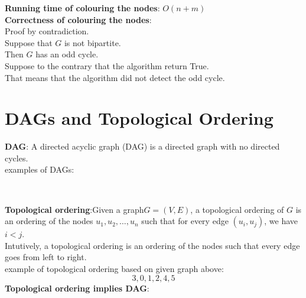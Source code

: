 \documentclass[onecolumn]{report}
\begin{document}
\noindent
\textbf{Running time of colouring the nodes}: $O(n+m)$\\
\textbf{Correctness of colouring the nodes}:\\
Proof by contradiction.\\
Suppose that $G$ is not bipartite.\\
Then $G$ has an odd cycle.\\
Suppose to the contrary that the algorithm return True.\\
That means that the algorithm did not detect the odd cycle.\\

\section{DAGs and Topological Ordering}
\textbf{DAG}: A directed acyclic graph (DAG) is a directed graph with no directed cycles.\\
examples of DAGs:\\
\begin{center}
    \\
\end{center}
\noindent
\textbf{Topological ordering}:Given a graph$G=(V,E)$, a topological ordering of $G$ is an ordering of the nodes $u_1,u_2,\dots,u_n$ such that for every edge $(u_i,u_j)$, we have $i<j$.\\
Intutively, a topological ordering is an ordering of the nodes such that every edge goes from left to right.\\
example of topological ordering based on given graph above:\\
\begin{equation*}
    3,0,1,2,4,5
\end{equation*}
\noindent
\textbf{Topological ordering implies DAG}:\\
\end{document}

